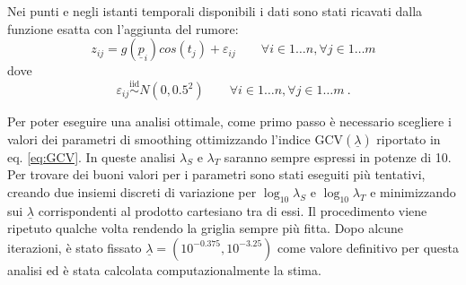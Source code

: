 \documentclass[a4paper,11pt,twoside,openright]{book}							%
\begin{document}
Nei punti e negli istanti temporali disponibili i dati sono stati ricavati dalla funzione esatta con l'aggiunta del rumore:
$$
z_{ij}=g(\underline p_{i})cos(t_j) + \varepsilon_{ij} \qquad \forall i \in 1\ldots n, \forall j \in 1\ldots m
$$
dove
$$
\varepsilon_{ij}\stackrel{\mathrm{iid}}{\sim}N(0,0.5^2) \qquad \forall i \in 1\ldots n, \forall j \in 1\ldots m \ .
$$

Per poter eseguire una analisi ottimale, come primo passo è necessario scegliere i valori dei parametri di smoothing ottimizzando l'indice $\mathrm{GCV}(\underline \lambda)$ riportato in eq. \ref{eq:GCV}. In queste analisi $\lambda_S$ e $\lambda_T$ saranno sempre espressi in potenze di 10. Per trovare dei buoni valori per i parametri sono stati eseguiti più tentativi, creando due insiemi discreti di variazione per $\log_{10}\lambda_S$ e $\log_{10}\lambda_T$ e minimizzando sui $\underline \lambda$ corrispondenti al prodotto cartesiano tra di essi. Il procedimento viene ripetuto qualche volta rendendo la griglia sempre più fitta. Dopo alcune iterazioni, è stato fissato $\underline \lambda = (10^{-0.375}, 10^{-3.25})$ come valore definitivo per questa analisi ed è stata calcolata computazionalmente la stima.
\end{document}
